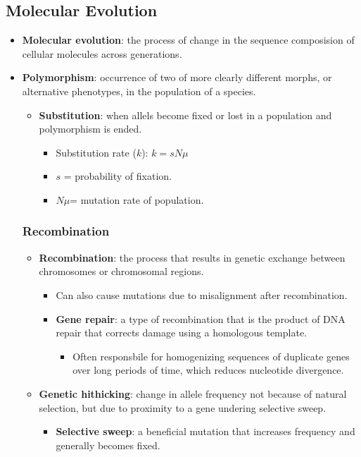 \documentclass[12pt,a4paper]{article}
\begin{document}
\subsection{Molecular Evolution}
\begin{itemize}
    \item \textbf{Molecular evolution}: the process of change in the sequence composision of cellular molecules across generations.
    \item \textbf{Polymorphism}: occurrence of two of more clearly different morphs, or alternative phenotypes, in the population of a species.
    \begin{itemize}
        \item \textbf{Substitution}: when allels become fixed or lost in a population and polymorphism is ended.
            \begin{itemize}
                \item Substitution rate (\(k\)): \(k = sN\mu\)
                \item \(s\) = probability of fixation.
                \item \(N\mu\)= mutation rate of population.
            \end{itemize}
    \end{itemize}
    \subsubsection{Recombination}
    \begin{itemize}
    \item \textbf{Recombination}: the process that results in genetic exchange between chromosomes or chromosomal regions.
        \begin{itemize}
            \item Can also cause mutations due to misalignment after recombination.
            \item \textbf{Gene repair}: a type of recombination that is the product of DNA repair that corrects damage using a homologous template. 
                \begin{itemize}
                    \item Often responsbile for homogenizing sequences of duplicate genes over long periods of time, which reduces nucleotide divergence.
                \end{itemize}
        \end{itemize}
    \item \textbf{Genetic hithicking}: change in allele frequency not because of natural selection, but due to proximity to a gene undering selective sweep.
        \begin{itemize}
            \item \textbf{Selective sweep}: a beneficial mutation that increases frequency and generally becomes fixed. 
        \end{itemize}
    \end{itemize}

\end{itemize}
\end{document}
